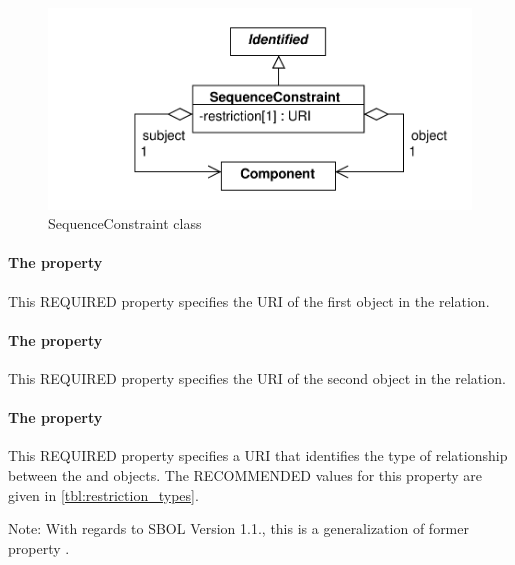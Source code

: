 \begin{figure}[ht]
\begin{center}
\includegraphics[scale=0.6]{uml/sequence_constraint}
\caption[]{SequenceConstraint class}
\label{uml:sequence_constraint}
\end{center}
\end{figure}

\paragraph{The  property}
\label{sec:subject}
This REQUIRED property specifies the URI  of the first  object in the relation.


\paragraph{The  property}
\label{sec:object}
This REQUIRED property specifies the URI  of the second  object in the relation.

\paragraph{The  property}
\label{sec:restriction}

This REQUIRED property specifies a URI that identifies the type of relationship between the  and   objects. 
The RECOMMENDED values for this property are given in \ref{tbl:restriction_types}.

Note: With regards to SBOL Version 1.1., this is a generalization of former  property .

